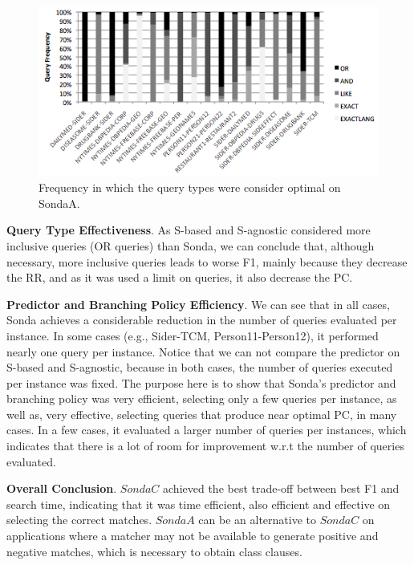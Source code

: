 \begin{figure} [h]
\vspace{-10pt}
\centering
\includegraphics[scale=0.5]{p8.png}
\caption{Frequency in which the query types were consider optimal on SondaA.} 
\vspace{-10pt}
\label{fig:frequency}
\end{figure}

\textbf{Query Type Effectiveness}. As S-based and S-agnostic considered more inclusive queries (OR queries) than Sonda, we can conclude that, although necessary, more inclusive queries leads to worse F1, mainly because they decrease the RR, and as it was used a limit on queries, it also decrease the PC.  

\textbf{Predictor and Branching Policy Efficiency}. We can see that in all cases, Sonda achieves a considerable reduction in the number of queries evaluated per instance. In some cases (e.g., Sider-TCM, Person11-Person12), it performed nearly one query per instance. Notice that we can not compare the predictor on S-based and S-agnostic, because in both cases, the number of queries executed per instance was fixed. The purpose here is to show  that Sonda's predictor and branching policy was very efficient, selecting only a few queries per instance, as well as, very effective, selecting queries that produce near optimal PC, in many cases. In a few cases, it evaluated a larger number of queries per instances, which indicates that there is a lot of room for improvement w.r.t the number of queries evaluated.

\textbf{Overall Conclusion}. $SondaC$ achieved the best trade-off between best F1 and search time, indicating that it was time efficient, also efficient and effective on selecting the correct matches. $SondaA$ can be an alternative to $SondaC$ on applications where a matcher may not be available to generate positive and negative matches, which is necessary to obtain class clauses.

